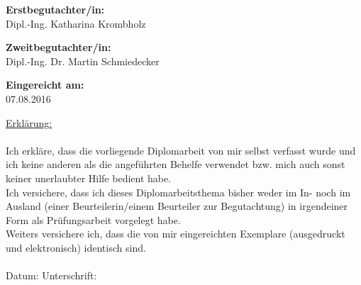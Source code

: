 \begin{center}
\hspace*{-1.0cm} \textbf{Erstbegutachter/in:} \\
\hspace*{-1.0cm} Dipl.-Ing. Katharina Krombholz \\

\vspace{0.5cm}

\hspace*{-1.0cm} \textbf{Zweitbegutachter/in:} \\
\hspace*{-1.0cm} Dipl.-Ing. Dr. Martin Schmiedecker \\


\vspace{1.4cm}

\hspace*{-1.0cm} \textbf{Eingereicht am:} \\
\hspace*{-1.0cm} 07.08.2016 \\

\end{center}

\newpage

\pagestyle{empty}

\vspace*{16.5cm}  %

\hspace*{-0.7cm} \underline{Erklärung:}\\\\
Ich erkläre, dass die vorliegende Diplomarbeit von mir selbst verfasst wurde und ich keine anderen als die angeführten Behelfe verwendet bzw. mich auch sonst keiner unerlaubter Hilfe bedient habe.\\
Ich versichere, dass ich dieses Diplomarbeitsthema bisher weder im In- noch im Ausland (einer Beurteilerin/einem Beurteiler zur Begutachtung) in irgendeiner Form als Prüfungsarbeit vorgelegt habe.\\
Weiters versichere ich, dass die von mir eingereichten Exemplare (ausgedruckt und elektronisch) identisch sind.\\\\
Datum: \hspace{6cm} Unterschrift:\\






